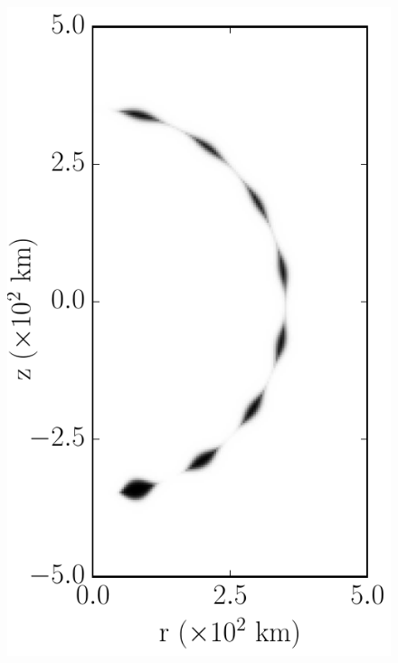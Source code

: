 \documentclass[iop,apj]{emulateapj}
\begin{document}
\begin{figure}[!ht]
  \begin{minipage}{0.24\textwidth}
    \includegraphics[width=\linewidth]{"figures/samples/cone_400k_m16_a12_0000"}
  \end{minipage} \hfill
  \begin{minipage}{0.24\textwidth}

\end{minipage}
\end{figure}
\end{document}
